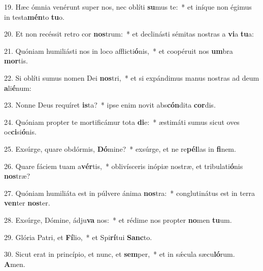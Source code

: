 19. Hæc ómnia venérunt super nos, nec oblíti \textbf{su}mus te:~*  et iníque non égimus in testa\textbf{mén}to \textbf{tu}o.\

20. Et non recéssit retro cor \textbf{nos}trum:~*  et declinásti sémitas nostras a \textbf{vi}a \textbf{tu}a:\

21. Quóniam humiliásti nos in loco afflicti\textbf{ó}nis,~*  et coopéruit nos \textbf{um}bra \textbf{mor}tis.\

22. Si oblíti sumus nomen Dei \textbf{nos}tri,~*  et si expándimus manus nostras ad deum \textbf{a}li\textbf{é}num:\

23. Nonne Deus requíret \textbf{is}ta?~*  ipse enim novit abs\textbf{cón}dita \textbf{cor}dis.\

24. Quóniam propter te mortificámur tota \textbf{di}e:~*  æstimáti sumus sicut oves oc\textbf{ci}si\textbf{ó}nis.\

25. Exsúrge, quare obdórmis, \textbf{Dó}mine?~*  exsúrge, et ne re\textbf{pél}las in \textbf{fi}nem.\

26. Quare fáciem tuam a\textbf{vér}tis,~*  oblivísceris inópiæ nostræ, et tribulati\textbf{ó}nis \textbf{nos}træ?\

27. Quóniam humiliáta est in púlvere ánima \textbf{nos}tra:~*  conglutinátus est in terra \textbf{ven}ter \textbf{nos}ter.\

28. Exsúrge, Dómine, ádju\textbf{va} nos:~*  et rédime nos propter \textbf{no}men \textbf{tu}um.\

29. Glória Patri, et \textbf{Fí}lio,~*  et Spi\textbf{rí}tui \textbf{Sanc}to.\

30. Sicut erat in princípio, et nunc, et \textbf{sem}per,~*  et in sǽcula sæcu\textbf{ló}rum. \textbf{A}men.\

